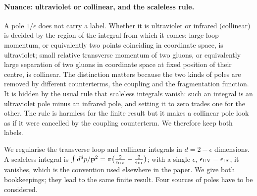 \paragraph{Nuance: ultraviolet or collinear, and the scaleless rule.} A pole $1/\epsilon$ does not carry a label. Whether it is ultraviolet or infrared (collinear) is decided by the region of the integral from which it comes: large loop momentum, or equivalently two points coinciding in coordinate space, is ultraviolet; small relative transverse momentum of two gluons, or equivalently large separation of two gluons in coordinate space at fixed position of their centre, is collinear. The distinction matters because the two kinds of poles are removed by different counterterms, the coupling and the fragmentation function. It is hidden by the usual rule that scaleless integrals vanish: such an integral is an ultraviolet pole minus an infrared pole, and setting it to zero trades one for the other. The rule is harmless for the finite result but it makes a collinear pole look as if it were cancelled by the coupling counterterm. We therefore keep both labels.

We regularise the transverse loop and collinear integrals in $d=2-\epsilon$ dimensions. A scaleless integral is $\int d^dp/\mathbf{p}^2=\pi\big(\frac{2}{\epsilon_{\rm UV}}-\frac{2}{\epsilon_{\rm IR}}\big)$; with a single $\epsilon$, $\epsilon_{\rm UV}=\epsilon_{\rm IR}$, it vanishes, which is the convention used elsewhere in the paper. We give both bookkeepings; they lead to the same finite result. Four sources of poles have to be considered.

